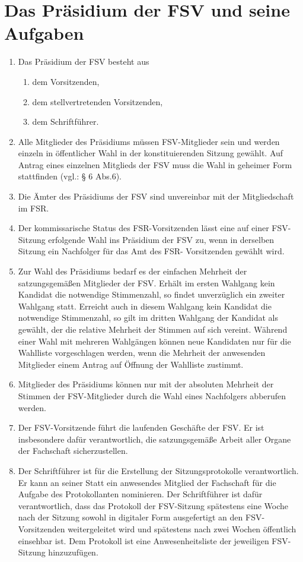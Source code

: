 \documentclass{article}
\providecommand{\tightlist}{\setlength{\itemsep}{0pt}\setlength{\parskip}{0pt}}
\begin{document}
\section{Das Präsidium der FSV und seine Aufgaben}\label{das-pruxe4sidium-der-fsv-und-seine-aufgaben}

\begin{enumerate}[(1)]
	\item Das Präsidium der FSV besteht aus
	\begin{enumerate}[1.]
		\tightlist
		\item dem Vorsitzenden,
		\item dem stellvertretenden Vorsitzenden,
		\item dem Schriftführer.
	\end{enumerate}
	\item Alle Mitglieder des Präsidiums müssen FSV-Mitglieder sein und werden einzeln in öffentlicher Wahl in der konstituierenden Sitzung gewählt. Auf Antrag eines einzelnen Mitglieds der FSV muss die Wahl in geheimer Form stattfinden (vgl.: § 6 Abs.6).
	\item Die Ämter des Präsidiums der FSV sind unvereinbar mit der Mitgliedschaft im FSR.
	\item Der kommissarische Status des FSR-Vorsitzenden lässt eine auf einer FSV-Sitzung erfolgende Wahl ins Präsidium der FSV zu, wenn in derselben Sitzung ein Nachfolger für das Amt des FSR- Vorsitzenden gewählt wird.
	\item Zur Wahl des Präsidiums bedarf es der einfachen Mehrheit der satzungsgemäßen Mitglieder der FSV. Erhält im ersten Wahlgang kein Kandidat die notwendige Stimmenzahl, so findet unverzüglich ein zweiter Wahlgang statt. Erreicht auch in diesem Wahlgang kein Kandidat die notwendige Stimmenzahl, so gilt im dritten Wahlgang der Kandidat als gewählt, der die relative Mehrheit der Stimmen auf sich vereint. Während einer Wahl mit mehreren Wahlgängen können neue Kandidaten nur für die Wahlliste vorgeschlagen werden, wenn die Mehrheit der anwesenden Mitglieder einem Antrag auf Öffnung der Wahlliste zustimmt.
	\item Mitglieder des Präsidiums können nur mit der absoluten Mehrheit der Stimmen der FSV-Mitglieder durch die Wahl eines Nachfolgers abberufen werden.
	\item Der FSV-Vorsitzende führt die laufenden Geschäfte der FSV. Er ist insbesondere dafür verantwortlich, die satzungsgemäße Arbeit aller Organe der Fachschaft sicherzustellen.
	\item Der Schriftführer ist für die Erstellung der Sitzungsprotokolle verantwortlich. Er kann an seiner Statt ein anwesendes Mitglied der Fachschaft für die Aufgabe des Protokollanten nominieren. Der Schriftführer ist dafür verantwortlich, dass das Protokoll der FSV-Sitzung spätestens eine Woche nach der Sitzung sowohl in digitaler Form ausgefertigt an den FSV-Vorsitzenden weitergeleitet wird und spätestens nach zwei Wochen öffentlich einsehbar ist. Dem Protokoll ist eine Anwesenheitsliste der jeweiligen FSV-Sitzung hinzuzufügen.

\end{enumerate}
\end{document}

